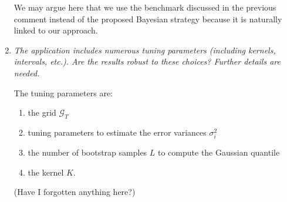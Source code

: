 \documentclass[a4paper,12pt]{article}
\begin{document}
\begin{enumerate}[label=\arabic*.,leftmargin=0.6cm]
{\color{blue}  
We may argue here that we use the benchmark discussed in the previous comment instead of the proposed Bayesian strategy because it is naturally linked to our approach. 
}

  
\item \textit{The application includes numerous tuning parameters (including kernels, intervals, etc.). Are the results robust to these choices? Further details are needed.}

{\color{blue}  
The tuning parameters are:
\begin{enumerate}[label=(\alph*),leftmargin=0.75cm,itemsep=0pt,topsep=0pt]
\item the grid $\mathcal{G}_T$
\item tuning parameters to estimate the error variances $\sigma_i^2$ 
\item the number of bootstrap samples $L$ to compute the Gaussian quantile
\item the kernel $K$.
\end{enumerate}
(Have I forgotten anything here?)
  
}
\end{enumerate}
\end{document}
